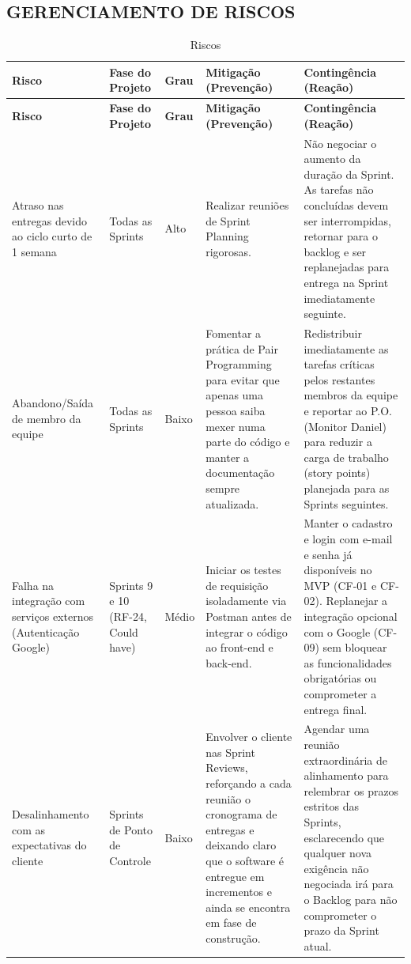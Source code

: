 \subsection{GERENCIAMENTO DE RISCOS}

\begingroup
\small
\setlength{\tabcolsep}{3pt}
\renewcommand{\arraystretch}{1.2}
\begin{longtable}{|>{\raggedright\arraybackslash}p{}|>{\raggedright\arraybackslash}p{}|>{\raggedright\arraybackslash}p{}|>{\raggedright\arraybackslash}p{}|>{\raggedright\arraybackslash}p{}|}
\caption{Riscos}\\
\hline
\textbf{Risco} & \textbf{Fase do Projeto} & \textbf{Grau} & \textbf{Mitigação (Prevenção)} & \textbf{Contingência (Reação)} \\ \hline
\endfirsthead
\textbf{Risco} & \textbf{Fase do Projeto} & \textbf{Grau} & \textbf{Mitigação (Prevenção)} & \textbf{Contingência (Reação)} \\ \hline
\endhead
Atraso nas entregas devido ao ciclo curto de 1 semana & Todas as Sprints & Alto & Realizar reuniões de Sprint Planning rigorosas. & Não negociar o aumento da duração da Sprint. As tarefas não concluídas devem ser interrompidas, retornar para o backlog e ser replanejadas para entrega na Sprint imediatamente seguinte. \\ \hline
Abandono/Saída de membro da equipe & Todas as Sprints & Baixo & Fomentar a prática de Pair Programming para evitar que apenas uma pessoa saiba mexer numa parte do código e manter a documentação sempre atualizada. & Redistribuir imediatamente as tarefas críticas pelos restantes membros da equipe e reportar ao P.O. (Monitor Daniel) para reduzir a carga de trabalho (story points) planejada para as Sprints seguintes. \\ \hline
Falha na integração com serviços externos (Autenticação Google) & Sprints 9 e 10 (RF-24, Could have) & Médio & Iniciar os testes de requisição isoladamente via Postman antes de integrar o código ao front-end e back-end. & Manter o cadastro e login com e-mail e senha já disponíveis no MVP (CF-01 e CF-02). Replanejar a integração opcional com o Google (CF-09) sem bloquear as funcionalidades obrigatórias ou comprometer a entrega final. \\ \hline
Desalinhamento com as expectativas do cliente & Sprints de Ponto de Controle & Baixo & Envolver o cliente nas Sprint Reviews, reforçando a cada reunião o cronograma de entregas e deixando claro que o software é entregue em incrementos e ainda se encontra em fase de construção. & Agendar uma reunião extraordinária de alinhamento para relembrar os prazos estritos das Sprints, esclarecendo que qualquer nova exigência não negociada irá para o Backlog para não comprometer o prazo da Sprint atual. \\ \hline
\end{longtable}
\endgroup

